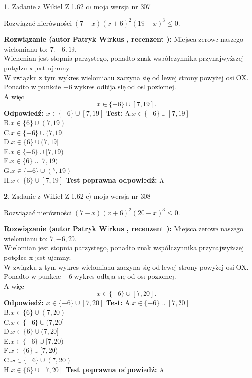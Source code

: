 \documentclass[12pt, a4paper]{article}
\theoremstyle{definition} %
\newtheorem{zad}{}
\newcommand{\zadStart}[1]{\begin{zad}#1\newline}
\newcommand{\zadStop}{\end{zad}}
\newcommand{\rozwStart}[2]{\noindent \textbf{Rozwiązanie (autor #1 , recenzent #2): }\newline}
\newcommand{\rozwStop}{\newline}
\newcommand{\odpStart}{\noindent \textbf{Odpowiedź:}\newline}
\newcommand{\odpStop}{\newline}
\newcommand{\testStart}{\noindent \textbf{Test:}\newline}
\newcommand{\testStop}{\newline}
\newcommand{\kluczStart}{\noindent \textbf{Test poprawna odpowiedź:}\newline}
\newcommand{\kluczStop}{\newline}
\begin{document}
\zadStart{Zadanie z Wikieł Z 1.62 c) moja wersja nr 307}

Rozwiązać nierówności $(7-x)(x+6)^{2}(19-x)^{3}\le0$.
\zadStop
\rozwStart{Patryk Wirkus}{}
Miejsca zerowe naszego wielomianu to: $7, -6, 19$.\\
Wielomian jest stopnia parzystego, ponadto znak współczynnika przy\linebreak najwyższej potędze x jest ujemny.\\ W związku z tym wykres wielomianu zaczyna się od lewej strony powyżej osi OX.\\
Ponadto w punkcie $-6$ wykres odbija się od osi poziomej.\\
A więc $$x \in \{-6\} \cup [7,19].$$
\rozwStop
\odpStart
$x \in \{-6\} \cup [7,19]$
\odpStop
\testStart
A.$x \in \{-6\} \cup [7,19]$\\
B.$x \in \{6\} \cup (7,19)$\\
C.$x \in \{-6\} \cup (7,19]$\\
D.$x \in \{6\} \cup (7,19]$\\
E.$x \in \{-6\} \cup [7,19)$\\
F.$x \in \{6\} \cup [7,19)$\\
G.$x \in \{-6\} \cup (7,19)$\\
H.$x \in \{6\} \cup [7,19]$
\testStop
\kluczStart
A
\kluczStop



\zadStart{Zadanie z Wikieł Z 1.62 c) moja wersja nr 308}

Rozwiązać nierówności $(7-x)(x+6)^{2}(20-x)^{3}\le0$.
\zadStop
\rozwStart{Patryk Wirkus}{}
Miejsca zerowe naszego wielomianu to: $7, -6, 20$.\\
Wielomian jest stopnia parzystego, ponadto znak współczynnika przy\linebreak najwyższej potędze x jest ujemny.\\ W związku z tym wykres wielomianu zaczyna się od lewej strony powyżej osi OX.\\
Ponadto w punkcie $-6$ wykres odbija się od osi poziomej.\\
A więc $$x \in \{-6\} \cup [7,20].$$
\rozwStop
\odpStart
$x \in \{-6\} \cup [7,20]$
\odpStop
\testStart
A.$x \in \{-6\} \cup [7,20]$\\
B.$x \in \{6\} \cup (7,20)$\\
C.$x \in \{-6\} \cup (7,20]$\\
D.$x \in \{6\} \cup (7,20]$\\
E.$x \in \{-6\} \cup [7,20)$\\
F.$x \in \{6\} \cup [7,20)$\\
G.$x \in \{-6\} \cup (7,20)$\\
H.$x \in \{6\} \cup [7,20]$
\testStop
\kluczStart
A
\kluczStop
\end{document}
